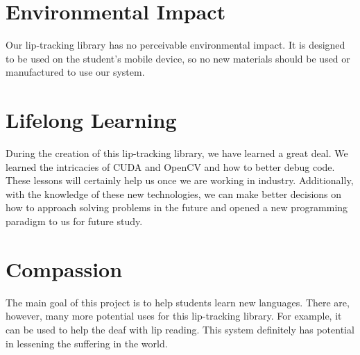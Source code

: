 \section{Environmental Impact}
Our lip-tracking library has no perceivable environmental impact. It is designed to be used on the student's mobile device, so no new materials should be used or manufactured to use our system.

\section{Lifelong Learning}
During the creation of this lip-tracking library, we have learned a great deal. We learned the intricacies of CUDA and OpenCV and how to better debug code. These lessons will certainly help us once we are working in industry. Additionally, with the knowledge of these new technologies, we can make better decisions on how to approach solving problems in the future and opened a new programming paradigm to us for future study.

\section{Compassion}
The main goal of this project is to help students learn new languages. There are, however, many more potential uses for this lip-tracking library. For example, it can be used to help the deaf with lip reading. This system definitely has potential in lessening the suffering in the world.